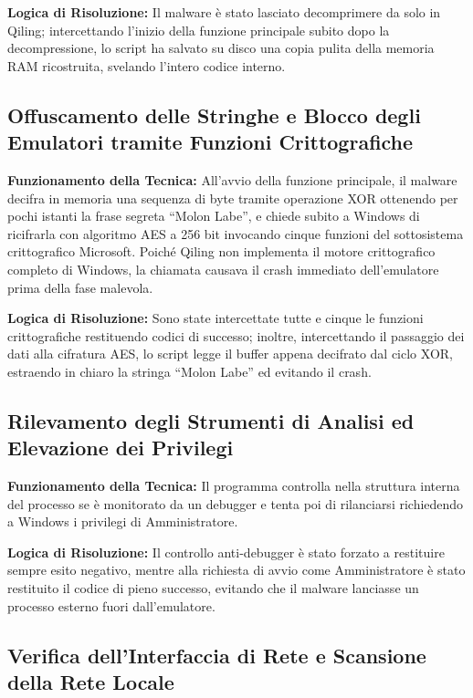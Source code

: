 \documentclass[11pt, a4paper]{article}
\begin{document}
	\textbf{Logica di Risoluzione:} Il malware è stato lasciato decomprimere da solo in Qiling; intercettando l'inizio della funzione principale subito dopo la decompressione, lo script ha salvato su disco una copia pulita della memoria RAM ricostruita, svelando l'intero codice interno.
	
	\subsection{Offuscamento delle Stringhe e Blocco degli Emulatori tramite Funzioni Crittografiche}
	
	\textbf{Funzionamento della Tecnica:} All'avvio della funzione principale, il malware decifra in memoria una sequenza di byte tramite operazione XOR ottenendo per pochi istanti la frase segreta ``Molon Labe'', e chiede subito a Windows di ricifrarla con algoritmo AES a 256 bit invocando cinque funzioni del sottosistema crittografico Microsoft. Poiché Qiling non implementa il motore crittografico completo di Windows, la chiamata causava il crash immediato dell'emulatore prima della fase malevola.
	
	\textbf{Logica di Risoluzione:} Sono state intercettate tutte e cinque le funzioni crittografiche restituendo codici di successo; inoltre, intercettando il passaggio dei dati alla cifratura AES, lo script legge il buffer appena decifrato dal ciclo XOR, estraendo in chiaro la stringa ``Molon Labe'' ed evitando il crash.
	
	\subsection{Rilevamento degli Strumenti di Analisi ed Elevazione dei Privilegi}
	
	\textbf{Funzionamento della Tecnica:} Il programma controlla nella struttura interna del processo se è monitorato da un debugger e tenta poi di rilanciarsi richiedendo a Windows i privilegi di Amministratore.
	
	\textbf{Logica di Risoluzione:} Il controllo anti-debugger è stato forzato a restituire sempre esito negativo, mentre alla richiesta di avvio come Amministratore è stato restituito il codice di pieno successo, evitando che il malware lanciasse un processo esterno fuori dall'emulatore.
	
	\subsection{Verifica dell'Interfaccia di Rete e Scansione della Rete Locale}
	
\end{document}
